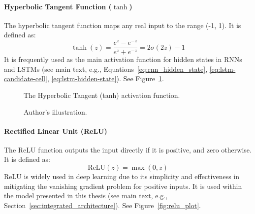\begin{appendices}
  \paragraph{Hyperbolic Tangent Function (\( \tanh \))}
  The hyperbolic tangent function maps any real input to the range (-1, 1). It is defined as:
  \begin{equation}
    \tanh(z) = \frac{e^z - e^{-z}}{e^z + e^{-z}} = 2\sigma(2z) - 1
  \end{equation}
  It is frequently used as the main activation function for hidden states in RNNs and LSTMs (see main text, e.g., Equations~\ref{eq:rnn_hidden_state}, \ref{eq:lstm-candidate-cell}, \ref{eq:lstm-hidden-state}). See Figure~\ref{fig:tanh_plot}.

  \begin{figure}[htbp]
    \centering
    \caption[Tanh activation function]{The Hyperbolic Tangent (tanh) activation function.}
    \label{fig:tanh_plot}
    \caption*{Author's illustration.}
  \end{figure}


  \paragraph{Rectified Linear Unit (ReLU)}
  The ReLU function outputs the input directly if it is positive, and zero otherwise. It is defined as:
  \begin{equation}
    \text{ReLU}(z) = \max(0, z)
  \end{equation}
  ReLU is widely used in deep learning due to its simplicity and effectiveness in mitigating the vanishing gradient problem for positive inputs. It is used within the model presented in this thesis (see main text, e.g., Section~\ref{sec:integrated_architecture}). See Figure~\ref{fig:relu_plot}.


\end{appendices}
